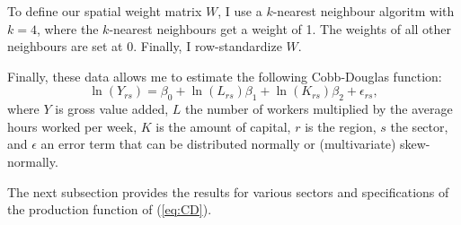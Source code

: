 \documentclass[11pt,parskip,abstracton,notitlepage]{scrartcl}
\begin{document}
To define our spatial weight matrix $W$, I use a $k$-nearest neighbour algoritm with $k = 4$, where the $k$-nearest neighbours get a weight of 1. The weights of all other neighbours are set at 0. Finally, I row-standardize $W$. 

Finally, these data allows me to estimate the following Cobb-Douglas function:
\begin{equation}
\ln \left(Y_{rs}\right) = \beta_0 + \ln({L}_{rs}) \beta_1 + \ln({K}_{rs})\beta_2 + \epsilon_{rs},
\label{eq:CD}
\end{equation}
where $Y$ is gross value added, $L$ the number of workers multiplied by the average hours worked per week, $K$ is the amount of capital, $r$ is the region, $s$ the sector, and $\epsilon$ an error term that can be distributed normally or (multivariate) skew-normally.

The next subsection provides the results for various sectors and specifications of the production function of (\ref{eq:CD}). 
%
\end{document}
